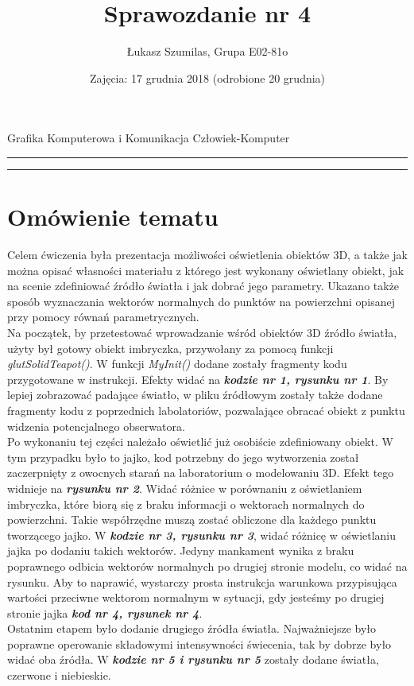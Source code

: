 \documentclass[polish,polish,a4paper]{article}
\title{Sprawozdanie nr 4}
\author{Łukasz Szumilas, Grupa E02-81o}
\date{Zajęcia: 17 grudnia 2018 (odrobione 20 grudnia)}
\begin{document}
  \begin{center}\Large
    Grafika Komputerowa i Komunikacja Człowiek-Komputer
  \end{center}
  \hrule
  {\let\newpage\relax\maketitle}
  \hrule


  \section{Omówienie tematu}
  Celem ćwiczenia była prezentacja możliwości oświetlenia obiektów 3D, a także jak można opisać własności materiału z którego jest wykonany oświetlany obiekt, jak na scenie zdefiniować źródło światła i jak dobrać jego parametry. Ukazano także sposób wyznaczania wektorów normalnych do punktów na powierzchni opisanej przy pomocy równań parametrycznych.
\\\indent Na początek, by przetestować wprowadzanie wśród obiektów 3D źródło światła, użyty był gotowy obiekt imbryczka, przywołany za pomocą funkcji  \textit{glutSolidTeapot()}. W funkcji \textit{MyInit()} dodane zostały fragmenty kodu przygotowane w instrukcji. Efekty widać na \textbf{\textit{kodzie nr 1, rysunku nr 1}}. By lepiej zobrazować padające światło, w pliku źródłowym zostały także dodane fragmenty kodu z poprzednich labolatoriów, pozwalające obracać obiekt z punktu widzenia potencjalnego obserwatora.
\\\indent Po wykonaniu tej części należało oświetlić już osobiście zdefiniowany obiekt. W tym przypadku było to jajko, kod potrzebny do jego wytworzenia został zaczerpnięty z owocnych starań na laboratorium o modelowaniu 3D. Efekt tego widnieje na \textbf{\textit{rysunku nr 2}}. Widać różnice w porównaniu z oświetlaniem imbryczka, które biorą się z braku informacji o wektorach normalnych do powierzchni. Takie współrzędne muszą zostać obliczone dla każdego punktu tworzącego jajko. 
 W \textbf{\textit{kodzie nr 3, rysunku nr 3}}, widać różnicę w oświetlaniu jajka po dodaniu takich wektorów. Jedyny mankament wynika z braku poprawnego odbicia wektorów normalnych po drugiej stronie modelu, co widać na rysunku. Aby to naprawić, wystarczy prosta instrukcja warunkowa przypisująca wartości przeciwne wektorom normalnym w sytuacji, gdy jesteśmy po drugiej stronie jajka \textbf{\textit{kod nr 4, rysunek nr 4}}.
 \\\indent Ostatnim etapem było dodanie drugiego źródła światła. Najważniejsze było poprawne operowanie składowymi intensywności świecenia, tak by dobrze było widać oba źródła. W \textbf{\textit{kodzie nr 5 i rysunku nr 5}} zostały dodane światła, czerwone i niebieskie. 
\end{document}
